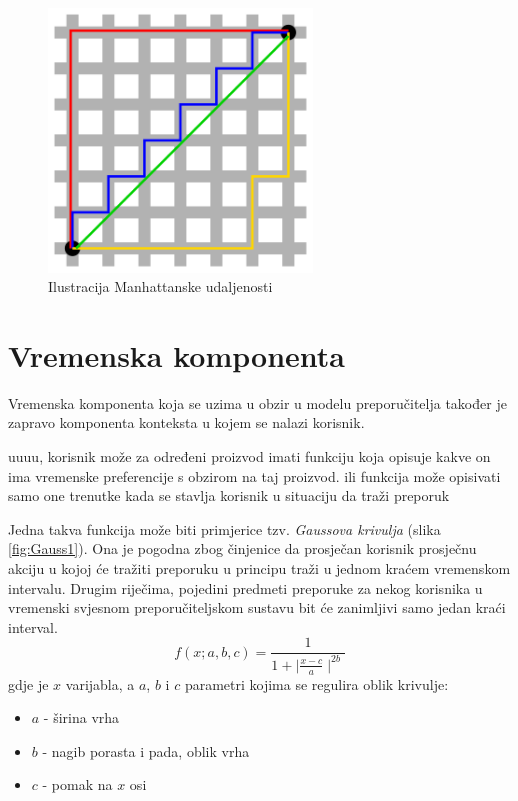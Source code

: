 \documentclass[times, utf8, diplomski, numeric]{fer}
\begin{document}
\begin{figure}[htb]
	\centering
	\includegraphics[width=7cm]{images/Manhattan_distance.png}
	\caption{Ilustracija Manhattanske udaljenosti}
	\label{fig:ManhattanDistance}
\end{figure}



\section{Vremenska komponenta}

Vremenska komponenta koja se uzima u obzir u modelu preporučitelja također je
zapravo komponenta konteksta u kojem se nalazi korisnik. 

uuuu, korisnik može za određeni proizvod imati funkciju koja opisuje kakve on
ima vremenske preferencije s obzirom na taj proizvod. ili funkcija može
opisivati samo one trenutke kada se stavlja korisnik u situaciju da traži
preporuk

Jedna takva funkcija može biti primjerice tzv. \emph{Gaussova krivulja}
(slika \ref{fig:Gauss1}). Ona je pogodna zbog činjenice da prosječan korisnik
prosječnu akciju u kojoj će tražiti preporuku u principu traži u jednom kraćem
vremenskom intervalu. Drugim riječima, pojedini predmeti preporuke za nekog
korisnika u vremenski svjesnom preporučiteljskom sustavu bit će zanimljivi samo
jedan kraći interval.
\begin{equation}
	\label{eq:BellFunc}
	f(x;a,b,c) = \frac
	{
		1
	}
	{
		1 + \mid\frac{x - c}{a}\mid^{2b}
	}
\end{equation}
gdje je $x$ varijabla, a $a$, $b$ i $c$ parametri kojima se regulira oblik
krivulje:
\begin{itemize}
  \item $a$ - širina vrha
  \item $b$ - nagib porasta i pada, oblik vrha
  \item $c$ - pomak na $x$ osi
\end{itemize}
\end{document}
